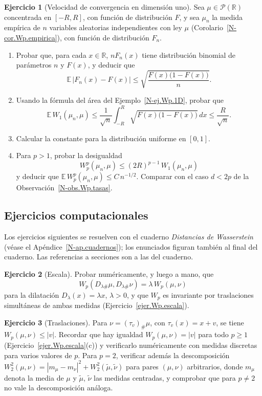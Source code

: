 \documentclass[11pt,a4paper]{amsart}
\newcounter{chapter}
\newcommand{\R}{{\mathbb R}}
\newcommand{\E}{{\mathbb E}}
\theoremstyle{remark}
\theoremstyle{definition}
\newtheorem{ejercicio}{Ejercicio}[chapter]
\numberwithin{subsection}{section}
\numberwithin{equation}{section}
\begin{document}
\begin{ejercicio}[Velocidad de convergencia en dimensión uno]\label{ejer.Wp.empirica.1D}
Sea $\mu\in\mathcal P(\R)$ concentrada en $[-R,R]$, con función de
distribución $F$, y sea $\mu_n$ la medida empírica de $n$ variables
aleatorias independientes con ley $\mu$
(Corolario~\ref{N-cor.Wp.empirica}), con función de distribución $F_n$.
\begin{enumerate}[label=(\alph*)]
\item Probar que, para cada $x\in\R$, $nF_n(x)$ tiene distribución binomial
de parámetros $n$ y $F(x)$, y deducir que
\[
\E\,|F_n(x)-F(x)|\le\sqrt{\frac{F(x)\bigl(1-F(x)\bigr)}{n}}.
\]
\item Usando la fórmula del área del Ejemplo~\ref{N-ej.Wp.1D}, probar que
\[
\E\,W_1(\mu_n,\mu)\le\frac1{\sqrt n}\int_{-R}^R\sqrt{F(x)\bigl(1-F(x)\bigr)}\,dx
\le\frac R{\sqrt n}.
\]
\item Calcular la constante para la distribución uniforme en $[0,1]$.
\item Para $p>1$, probar la desigualdad
\[
W_p^p(\mu_n,\mu)\le(2R)^{p-1}\,W_1(\mu_n,\mu)
\]
y deducir que $\E\,W_p^p(\mu_n,\mu)\le C\,n^{-1/2}$. Comparar con el caso
$d<2p$ de la Observación~\ref{N-obs.Wp.tasas}.
\end{enumerate}
\end{ejercicio}

\subsection*{Ejercicios computacionales}

Los ejercicios siguientes se resuelven con el cuaderno \emph{Distancias de
Wasserstein} (véase el Apéndice~\ref{N-ap.cuadernos}); los enunciados figuran
también al final del cuaderno. Las referencias a secciones son a las del
cuaderno.

\begin{ejercicio}[Escala]\label{ejc.Wp.escala}
Probar numéricamente, y luego a mano, que
\[
W_p(D_{\lambda\#}\mu,D_{\lambda\#}\nu)=\lambda\,W_p(\mu,\nu)
\]
para la dilatación $D_\lambda(x)=\lambda x$, $\lambda>0$, y que $W_p$ es invariante
por traslaciones simultáneas de ambas medidas
(Ejercicio~\ref{ejer.Wp.escala}).
\end{ejercicio}

\begin{ejercicio}[Traslaciones]\label{ejc.Wp.traslaciones}
Para $\nu=(\tau_v)_\#\mu$, con $\tau_v(x)=x+v$, se tiene $W_p(\mu,\nu)\le|v|$.
Recordar que hay igualdad $W_p(\mu,\nu)=|v|$ para todo $p\ge1$
(Ejercicio~\ref{ejer.Wp.escala}(c)) y verificarlo numéricamente con medidas
discretas para varios valores de $p$. Para $p=2$, verificar además la
descomposición $W_2^2(\mu,\nu)=|m_\mu-m_\nu|^2+W_2^2(\tilde\mu,\tilde\nu)$
para pares $(\mu,\nu)$ arbitrarios, donde $m_\mu$ denota la media de $\mu$ y
$\tilde\mu$, $\tilde\nu$ las medidas centradas, y comprobar que para $p\ne2$
no vale la descomposición análoga.
\end{ejercicio}
\end{document}
